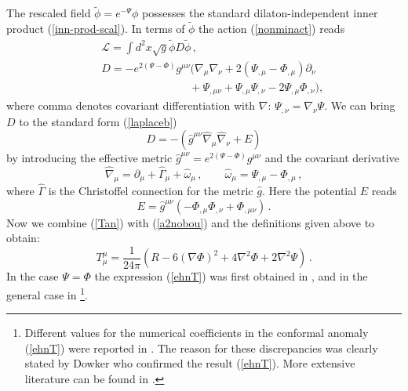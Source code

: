 The rescaled field $\tilde\phi =e^{-\Psi}\phi$ possesses the standard
dilaton-independent inner product (\ref{inn-prod-scal}). In terms 
of $\tilde\phi$ the action (\ref{nonminact}) reads  
\begin{eqnarray}
 &  & \mathcal{L}
=\int d^{2}x\sqrt{g}\tilde\phi D \tilde\phi \, ,\label{ehnac} \\
 &  & D=-e^{2(\Psi -\Phi )}g^{\mu \nu }(\nabla _{\mu }\nabla _{\nu }+2(\Psi _{,\mu }-\Phi _{,\mu })\partial _{\nu }\nonumber \\
&  & \qquad \qquad \qquad \qquad 
+\Psi _{,\mu \nu }+\Psi _{,\mu }\Psi _{,\nu }-2\Psi _{,\mu }\Phi _{,\nu }),
\label{ehnA} 
\end{eqnarray}
where comma denotes covariant differentiation with $\nabla$:
$\Psi_{,\nu}=\nabla_\nu\Psi$.
We can bring $D$ to the standard form (\ref{laplaceb})
\begin{equation}
D=-(\hat g^{\mu\nu} \hat\nabla_\mu\hat\nabla_\nu +E) \label{hatlalpl}
\end{equation}
by introducing the effective metric 
$\hat g^{\mu\nu}=e^{2(\Psi -\Phi)}g^{\mu\nu}$ and the covariant derivative
\begin{equation}
\label{ehno}
\hat{\nabla }_{\mu }=\partial _{\mu }+\hat{\Gamma }_{\mu }+\hat{\omega }_{\mu }\, ,\qquad \hat{\omega }_{\mu }=\Psi _{,\mu }-\Phi _{,\mu }\, ,
\end{equation}
 where \( \hat{\Gamma } \) is the Christoffel connection for the metric \( \hat{g} \).
Here the potential $E$ reads 
\begin{equation}
\label{ehnEh}
E=\hat{g}^{\mu \nu }(-\Phi _{,\mu }\Phi _{,\nu }+\Phi _{,\mu \nu })\, .
\end{equation}
Now we combine (\ref{Tan}) with (\ref{a2nobou}) and the definitions
given above to obtain:
\begin{equation}
\label{ehnT}
T_{\mu }^{\mu }=\frac{1}{24\pi }(R-6(\nabla \Phi )^{2}+4\nabla ^{2}\Phi +2\nabla ^{2}\Psi )\,. 
\end{equation}
In the case $\Psi =\Phi$ the expression (\ref{ehnT}) was first obtained in
\cite{Mukhanov:1994ax}, and in the general case in 
\cite{Kummer:1997jr}\footnote{Different values for the numerical coefficients
in the conformal anomaly (\ref{ehnT}) were reported in 
\cite{Bousso:1997cg,Nojiri:1997hx,Mikovic:1998xq,Nojiri:1998sr}.
The reason for these discrepancies was clearly stated by Dowker
\cite{Dowker:1998bm} who confirmed the result (\ref{ehnT}).
More extensive literature can be found in \cite{Grumiller:2002nm}.}.

